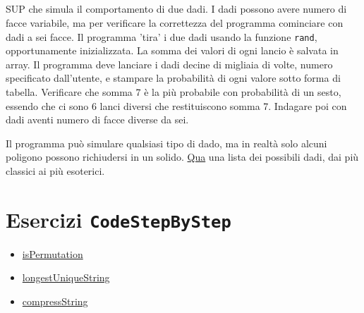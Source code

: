 \documentclass{article}
\begin{document}
\subsection{}
SUP che simula il comportamento di due dadi. I dadi possono avere numero di facce variabile, ma per verificare la correttezza del programma cominciare con dadi a sei facce. Il programma 'tira' i due dadi usando la funzione \texttt{rand}, opportunamente inizializzata. La somma dei valori di ogni lancio è salvata in array. Il programma deve lanciare i dadi decine di migliaia di volte, numero specificato dall'utente, e stampare la probabilità di ogni valore sotto forma di tabella. Verificare che somma 7 è la più probabile con probabilità di un sesto, essendo che ci sono 6 lanci diversi che restituiscono somma 7. Indagare poi con dadi aventi numero di facce diverse da sei.
\begin{info} 
	Il programma può simulare qualsiasi tipo di dado, ma in realtà solo alcuni poligono possono richiudersi in un solido. \href{https://en.wikipedia.org/wiki/Dice#Variants}{Qua} una lista dei possibili dadi, dai più classici ai più esoterici.
\end{info}



\section*{Esercizi \texttt{CodeStepByStep}}
\begin{itemize}
	\item \href{https://www.codestepbystep.com/problem/view/cpp/algorithms/isPermutation}{isPermutation}
	\item \href{https://www.codestepbystep.com/problem/view/cpp/algorithms/longestUniqueString}{longestUniqueString}
	\item \href{https://www.codestepbystep.com/problem/view/cpp/algorithms/compressString}{compressString}
\end{itemize}
\end{document}
